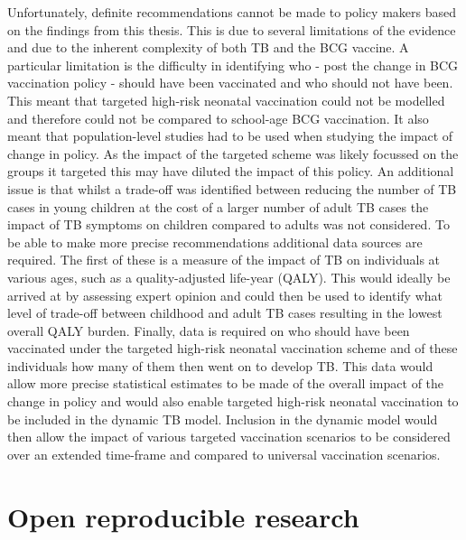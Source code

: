 \documentclass[11pt,twoside]{bristolthesis}
\begin{document}
  Unfortunately, definite recommendations cannot be made to policy makers based on the findings from this thesis. This is due to several limitations of the evidence and due to the inherent complexity of both TB and the BCG vaccine. A particular limitation is the difficulty in identifying who - post the change in BCG vaccination policy - should have been vaccinated and who should not have been. This meant that targeted high-risk neonatal vaccination could not be modelled and therefore could not be compared to school-age BCG vaccination. It also meant that population-level studies had to be used when studying the impact of change in policy. As the impact of the targeted scheme was likely focussed on the groups it targeted this may have diluted the impact of this policy. An additional issue is that whilst a trade-off was identified between reducing the number of TB cases in young children at the cost of a larger number of adult TB cases the impact of TB symptoms on children compared to adults was not considered. To be able to make more precise recommendations additional data sources are required. The first of these is a measure of the impact of TB on individuals at various ages, such as a quality-adjusted life-year (QALY). This would ideally be arrived at by assessing expert opinion and could then be used to identify what level of trade-off between childhood and adult TB cases resulting in the lowest overall QALY burden. Finally, data is required on who should have been vaccinated under the targeted high-risk neonatal vaccination scheme and of these individuals how many of them then went on to develop TB. This data would allow more precise statistical estimates to be made of the overall impact of the change in policy and would also enable targeted high-risk neonatal vaccination to be included in the dynamic TB model. Inclusion in the dynamic model would then allow the impact of various targeted vaccination scenarios to be considered over an extended time-frame and compared to universal vaccination scenarios.
  
  \hypertarget{open-reproducible-research}{%
  \section{Open reproducible research}\label{open-reproducible-research}}
  
\end{document}
